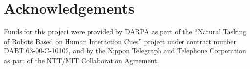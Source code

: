

\section*{Acknowledgements}

Funds for this project were provided by DARPA as
part of the ``Natural Tasking of Robots Based on Human Interaction
Cues'' project under contract number DABT 63-00-C-10102, and by the
Nippon Telegraph and Telephone Corporation as part of the NTT/MIT
Collaboration Agreement.

